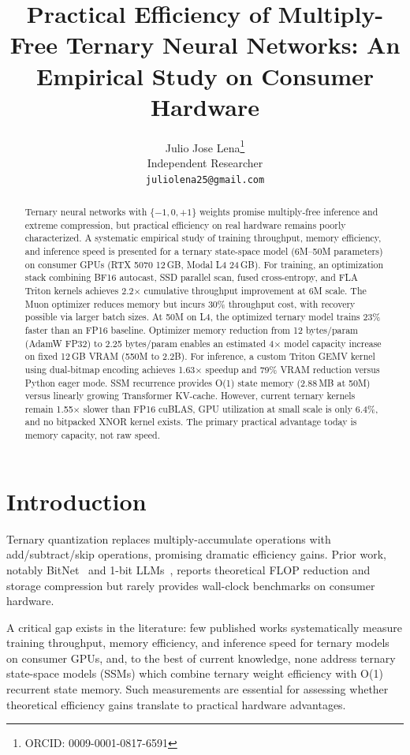 \documentclass{article}
\title{Practical Efficiency of Multiply-Free Ternary Neural Networks: An Empirical Study on Consumer Hardware}
\author{
  Julio Jose Lena\thanks{ORCID: 0009-0001-0817-6591} \\
  Independent Researcher \\
  \texttt{juliolena25@gmail.com}
}
\begin{document}
\maketitle

\begin{abstract}
Ternary neural networks with $\{-1, 0, +1\}$ weights promise multiply-free inference and extreme compression, but practical efficiency on real hardware remains poorly characterized. A systematic empirical study of training throughput, memory efficiency, and inference speed is presented for a ternary state-space model (6M--50M parameters) on consumer GPUs (RTX 5070 12\,GB, Modal L4 24\,GB). For training, an optimization stack combining BF16 autocast, SSD parallel scan, fused cross-entropy, and FLA Triton kernels achieves 2.2$\times$ cumulative throughput improvement at 6M scale. The Muon optimizer reduces memory but incurs 30\% throughput cost, with recovery possible via larger batch sizes. At 50M on L4, the optimized ternary model trains 23\% faster than an FP16 baseline. Optimizer memory reduction from 12 bytes/param (AdamW FP32) to 2.25 bytes/param enables an estimated 4$\times$ model capacity increase on fixed 12\,GB VRAM (550M to 2.2B). For inference, a custom Triton GEMV kernel using dual-bitmap encoding achieves 1.63$\times$ speedup and 79\% VRAM reduction versus Python eager mode. SSM recurrence provides O(1) state memory (2.88\,MB at 50M) versus linearly growing Transformer KV-cache. However, current ternary kernels remain 1.55$\times$ slower than FP16 cuBLAS, GPU utilization at small scale is only 6.4\%, and no bitpacked XNOR kernel exists. The primary practical advantage today is memory capacity, not raw speed.
\end{abstract}

\section{Introduction}

Ternary quantization replaces multiply-accumulate operations with add/subtract/skip operations, promising dramatic efficiency gains. Prior work, notably BitNet~\citep{wang2023bitnet} and 1-bit LLMs~\citep{ma2024era}, reports theoretical FLOP reduction and storage compression but rarely provides wall-clock benchmarks on consumer hardware.

A critical gap exists in the literature: few published works systematically measure training throughput, memory efficiency, and inference speed for ternary models on consumer GPUs, and, to the best of current knowledge, none address ternary state-space models (SSMs) which combine ternary weight efficiency with O(1) recurrent state memory. Such measurements are essential for assessing whether theoretical efficiency gains translate to practical hardware advantages.
\end{document}
